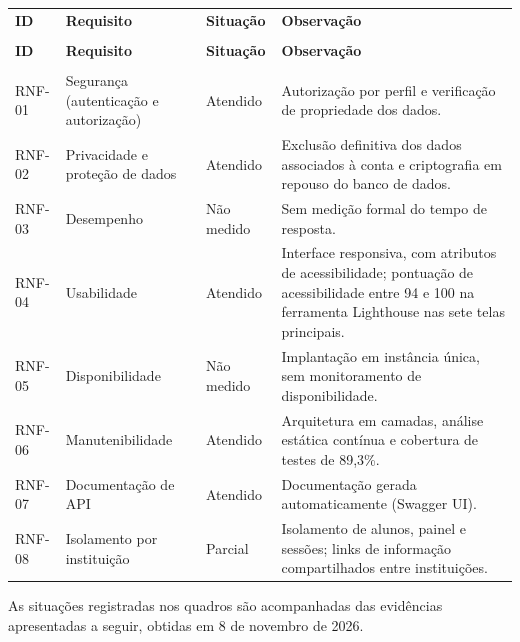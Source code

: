{\ABNTEXfontereduzida
\renewcommand{\arraystretch}{1.25}
\begin{xltabular}{\textwidth}{|>{\raggedright\arraybackslash}p{1.8cm}|>{\raggedright\arraybackslash}p{4.7cm}|>{\raggedright\arraybackslash}p{2.5cm}|>{\raggedright\arraybackslash}X|}
 \\[0.3em]
\hline
\textbf{ID} & \textbf{Requisito} & \textbf{Situação} & \textbf{Observação} \\
\hline
\endfirsthead
{} \\
\hline
\textbf{ID} & \textbf{Requisito} & \textbf{Situação} & \textbf{Observação} \\
\hline
\endhead
{} \\
\endfoot
\endlastfoot
RNF-01 & Segurança (autenticação e autorização) & Atendido & Autorização por perfil e verificação de propriedade dos dados. \\
\hline
RNF-02 & Privacidade e proteção de dados & Atendido & Exclusão definitiva dos dados associados à conta e criptografia em repouso do banco de dados. \\
\hline
RNF-03 & Desempenho & Não medido & Sem medição formal do tempo de resposta. \\
\hline
RNF-04 & Usabilidade & Atendido & Interface responsiva, com atributos de acessibilidade; pontuação de acessibilidade entre 94 e 100 na ferramenta Lighthouse nas sete telas principais. \\
\hline
RNF-05 & Disponibilidade & Não medido & Implantação em instância única, sem monitoramento de disponibilidade. \\
\hline
RNF-06 & Manutenibilidade & Atendido & Arquitetura em camadas, análise estática contínua e cobertura de testes de 89,3\%. \\
\hline
RNF-07 & Documentação de API & Atendido & Documentação gerada automaticamente (Swagger UI). \\
\hline
RNF-08 & Isolamento por instituição & Parcial & Isolamento de alunos, painel e sessões; links de informação compartilhados entre instituições. \\
\hline
\end{xltabular}
}

As situações registradas nos quadros são acompanhadas das evidências apresentadas a seguir, obtidas em 8 de novembro de 2026.

